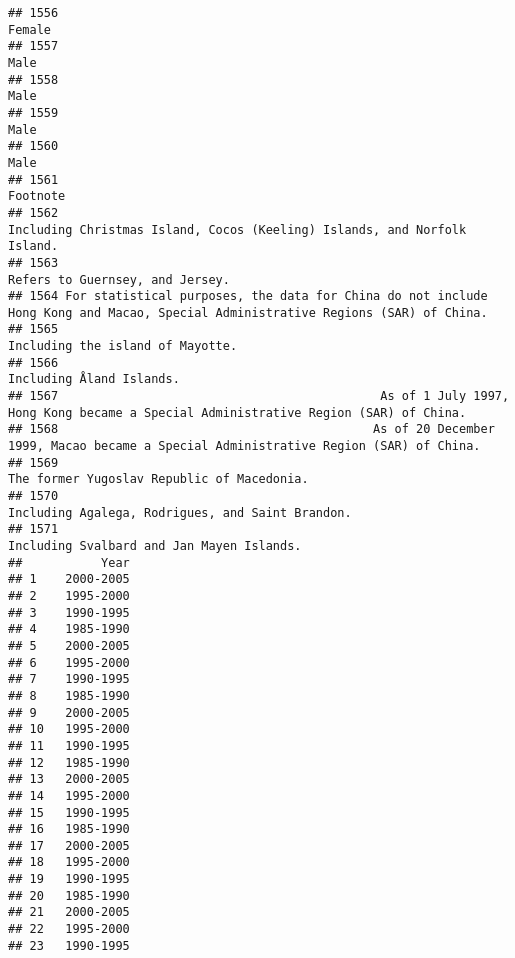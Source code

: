 \documentclass[]{article}
\begin{document}
\begin{verbatim}
## 1556                                                                                                                          Female
## 1557                                                                                                                            Male
## 1558                                                                                                                            Male
## 1559                                                                                                                            Male
## 1560                                                                                                                            Male
## 1561                                                                                                                        Footnote
## 1562                                                        Including Christmas Island, Cocos (Keeling) Islands, and Norfolk Island.
## 1563                                                                                                 Refers to Guernsey, and Jersey.
## 1564 For statistical purposes, the data for China do not include Hong Kong and Macao, Special Administrative Regions (SAR) of China.
## 1565                                                                                                Including the island of Mayotte.
## 1566                                                                                                        Including Åland Islands.
## 1567                                             As of 1 July 1997, Hong Kong became a Special Administrative Region (SAR) of China.
## 1568                                            As of 20 December 1999, Macao became a Special Administrative Region (SAR) of China.
## 1569                                                                                      The former Yugoslav Republic of Macedonia.
## 1570                                                                                Including Agalega, Rodrigues, and Saint Brandon.
## 1571                                                                                       Including Svalbard and Jan Mayen Islands.
##           Year
## 1    2000-2005
## 2    1995-2000
## 3    1990-1995
## 4    1985-1990
## 5    2000-2005
## 6    1995-2000
## 7    1990-1995
## 8    1985-1990
## 9    2000-2005
## 10   1995-2000
## 11   1990-1995
## 12   1985-1990
## 13   2000-2005
## 14   1995-2000
## 15   1990-1995
## 16   1985-1990
## 17   2000-2005
## 18   1995-2000
## 19   1990-1995
## 20   1985-1990
## 21   2000-2005
## 22   1995-2000
## 23   1990-1995

\end{verbatim}
\end{document}
